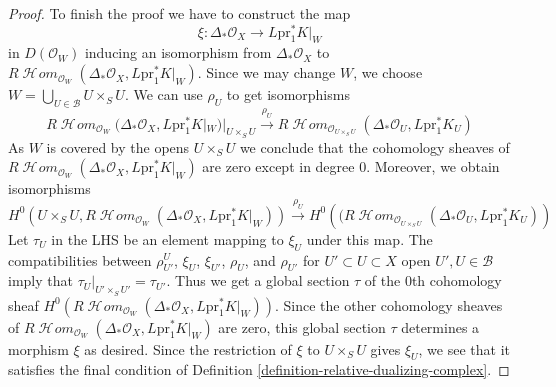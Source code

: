 \documentclass{amsart}
\theoremstyle{plain}
\theoremstyle{definition}
\theoremstyle{remark}
\numberwithin{equation}{subsection}
\def\SheafHom{\mathop{\mathcal{H}\!\mathit{om}}\nolimits}
\begin{document}
\begin{proof}
\medskip\noindent
To finish the proof we have to construct the map
$$
\xi : \Delta_*\mathcal{O}_X \longrightarrow L\text{pr}_1^*K|_W
$$
in $D(\mathcal{O}_W)$ inducing an isomorphism from $\Delta_*\mathcal{O}_X$ to
$R\SheafHom_{\mathcal{O}_W}(\Delta_*\mathcal{O}_X, L\text{pr}_1^*K|_W)$.
Since we may change $W$, we choose
$W = \bigcup_{U \in \mathcal{B}} U \times_S U$.
We can use $\rho_U$ to get isomorphisms
$$
R\SheafHom_{\mathcal{O}_W}(
\Delta_*\mathcal{O}_X, L\text{pr}_1^*K|_W)|_{U \times_S U}
\xrightarrow{\rho_U}
R\SheafHom_{\mathcal{O}_{U \times_S U}}(
\Delta_*\mathcal{O}_U, L\text{pr}_1^*K_U)
$$
As $W$ is covered by the opens $U \times_S U$
we conclude that the cohomology sheaves of
$R\SheafHom_{\mathcal{O}_W}(\Delta_*\mathcal{O}_X, L\text{pr}_1^*K|_W)$
are zero except in degree $0$. Moreover, we obtain isomorphisms
$$
H^0\left(U \times_S U, R\SheafHom_{\mathcal{O}_W}(\Delta_*\mathcal{O}_X,
L\text{pr}_1^*K|_W)\right)
\xrightarrow{\rho_U}
H^0\left((R\SheafHom_{\mathcal{O}_{U \times_S U}}(
\Delta_*\mathcal{O}_U, L\text{pr}_1^*K_U)\right)
$$
Let $\tau_U$ in the LHS be an element mapping to $\xi_U$ under this map.
The compatibilities between
$\rho^U_{U'}$, $\xi_U$, $\xi_{U'}$, $\rho_U$, and $\rho_{U'}$
for $U' \subset U \subset X$ open $U', U \in \mathcal{B}$
imply that $\tau_U|_{U' \times_S U'} = \tau_{U'}$.
Thus we get a global section $\tau$ of the $0$th cohomology sheaf
$H^0(R\SheafHom_{\mathcal{O}_W}(\Delta_*\mathcal{O}_X, L\text{pr}_1^*K|_W))$.
Since the other cohomology sheaves of
$R\SheafHom_{\mathcal{O}_W}(\Delta_*\mathcal{O}_X, L\text{pr}_1^*K|_W)$
are zero, this global section $\tau$
determines a morphism $\xi$ as desired. Since the restriction
of $\xi$ to $U \times_S U$ gives $\xi_U$, we see that it
satisfies the final condition of
Definition \ref{definition-relative-dualizing-complex}.
\end{proof}
\end{document}
